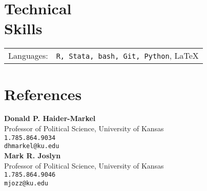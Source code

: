 \documentclass[margin,line,pifont,palatino,courier]{res}
\begin{document}
\begin{resume}





\section{\sc Technical \\ Skills}

\begin{tabular}{@{}p{0.8in}p{6in}}

Languages:& \verb+R, Stata, bash, Git, Python+, \LaTeX   \\

\end{tabular}






\section{\sc References}

{\bf Donald P. Haider-Markel} \\
Professor of Political Science, University of Kansas \\
\verb+1.785.864.9034+\\
\texttt{dhmarkel@ku.edu}\\

{\bf Mark R. Joslyn} \\
Professor of Political Science, University of Kansas \\
\verb+1.785.864.9046+\\
\texttt{mjozz@ku.edu}\\

\end{resume}
\end{document}

